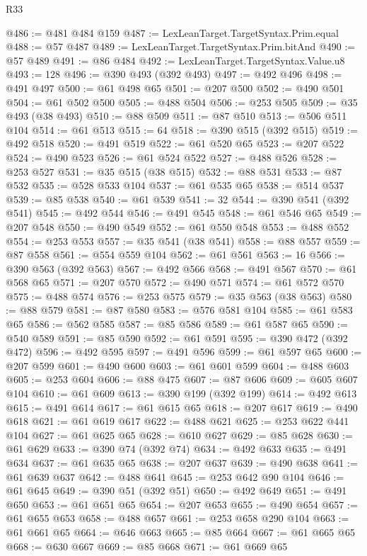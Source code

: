 \begin{lexlean}{R33}
\begin{coremodule}
@486 := @481 @484 @159
@487 := LexLeanTarget.TargetSyntax.Prim.equal
@488 := @57 @487
@489 := LexLeanTarget.TargetSyntax.Prim.bitAnd
@490 := @57 @489
@491 := @86 @484
@492 := LexLeanTarget.TargetSyntax.Value.u8
@493 := 128
@496 := @390 @493 (@392 @493)
@497 := @492 @496
@498 := @491 @497
@500 := @61 @498 @65
@501 := @207 @500
@502 := @490 @501
@504 := @61 @502 @500
@505 := @488 @504
@506 := @253 @505
@509 := @35 @493 (@38 @493)
@510 := @88 @509
@511 := @87 @510
@513 := @506 @511 @104
@514 := @61 @513
@515 := 64
@518 := @390 @515 (@392 @515)
@519 := @492 @518
@520 := @491 @519
@522 := @61 @520 @65
@523 := @207 @522
@524 := @490 @523
@526 := @61 @524 @522
@527 := @488 @526
@528 := @253 @527
@531 := @35 @515 (@38 @515)
@532 := @88 @531
@533 := @87 @532
@535 := @528 @533 @104
@537 := @61 @535 @65
@538 := @514 @537
@539 := @85 @538
@540 := @61 @539
@541 := 32
@544 := @390 @541 (@392 @541)
@545 := @492 @544
@546 := @491 @545
@548 := @61 @546 @65
@549 := @207 @548
@550 := @490 @549
@552 := @61 @550 @548
@553 := @488 @552
@554 := @253 @553
@557 := @35 @541 (@38 @541)
@558 := @88 @557
@559 := @87 @558
@561 := @554 @559 @104
@562 := @61 @561
@563 := 16
@566 := @390 @563 (@392 @563)
@567 := @492 @566
@568 := @491 @567
@570 := @61 @568 @65
@571 := @207 @570
@572 := @490 @571
@574 := @61 @572 @570
@575 := @488 @574
@576 := @253 @575
@579 := @35 @563 (@38 @563)
@580 := @88 @579
@581 := @87 @580
@583 := @576 @581 @104
@585 := @61 @583 @65
@586 := @562 @585
@587 := @85 @586
@589 := @61 @587 @65
@590 := @540 @589
@591 := @85 @590
@592 := @61 @591
@595 := @390 @472 (@392 @472)
@596 := @492 @595
@597 := @491 @596
@599 := @61 @597 @65
@600 := @207 @599
@601 := @490 @600
@603 := @61 @601 @599
@604 := @488 @603
@605 := @253 @604
@606 := @88 @475
@607 := @87 @606
@609 := @605 @607 @104
@610 := @61 @609
@613 := @390 @199 (@392 @199)
@614 := @492 @613
@615 := @491 @614
@617 := @61 @615 @65
@618 := @207 @617
@619 := @490 @618
@621 := @61 @619 @617
@622 := @488 @621
@625 := @253 @622 @441 @104
@627 := @61 @625 @65
@628 := @610 @627
@629 := @85 @628
@630 := @61 @629
@633 := @390 @74 (@392 @74)
@634 := @492 @633
@635 := @491 @634
@637 := @61 @635 @65
@638 := @207 @637
@639 := @490 @638
@641 := @61 @639 @637
@642 := @488 @641
@645 := @253 @642 @90 @104
@646 := @61 @645
@649 := @390 @51 (@392 @51)
@650 := @492 @649
@651 := @491 @650
@653 := @61 @651 @65
@654 := @207 @653
@655 := @490 @654
@657 := @61 @655 @653
@658 := @488 @657
@661 := @253 @658 @290 @104
@663 := @61 @661 @65
@664 := @646 @663
@665 := @85 @664
@667 := @61 @665 @65
@668 := @630 @667
@669 := @85 @668
@671 := @61 @669 @65

\end{coremodule}
\end{lexlean}
